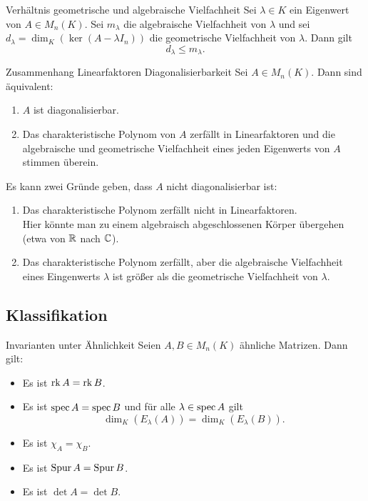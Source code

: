 \documentclass[main.tex]{subfiles}
\begin{document}
\begin{karte}{Verhältnis geometrische und algebraische Vielfachheit}
    Sei \( \lambda \in K \) ein Eigenwert von \( A \in M_n(K) \). 
    Sei \( m_\lambda \) die algebraische Vielfachheit von 
    \( \lambda \) und sei \( d_\lambda 
    = \dim_K(\ker(A - \lambda I_n)) \) die geometrische 
    Vielfachheit von \( \lambda \). Dann gilt
    \[ d_\lambda \leq m_\lambda. \]
\end{karte}
\begin{karte}{Zusammenhang Linearfaktoren Diagonalisierbarkeit}
    Sei \( A \in M_n(K) \). Dann sind äquivalent:
    \begin{enumerate}
        \item \(A\) ist diagonalisierbar.
        \item Das charakteristische Polynom von \(A\) zerfällt 
        in Linearfaktoren und die algebraische und geometrische 
        Vielfachheit eines jeden Eigenwerts von \(A\) stimmen 
        überein.
    \end{enumerate}
    Es kann zwei Gründe geben, dass \(A\) nicht diagonalisierbar 
    ist:
    \begin{enumerate}
        \item Das charakteristische Polynom zerfällt nicht in 
        Linearfaktoren.\\
        Hier könnte man zu einem algebraisch 
        abgeschlossenen Körper übergehen (etwa von \( \mathbb{R} \) 
        nach \( \mathbb{C} \)).
        \item Das charakteristische Polynom zerfällt, aber die 
        algebraische Vielfachheit eines Eingenwerts \( \lambda \) 
        ist größer als die geometrische Vielfachheit von 
        \( \lambda \).
    \end{enumerate}
\end{karte}
\subsection*{Klassifikation}
\begin{karte}{Invarianten unter Ähnlichkeit}
    Seien \( A, B \in M_n(K) \) ähnliche Matrizen. Dann gilt: 
    \begin{itemize}
        \item Es ist \( \operatorname{rk} A = \operatorname{rk} B \).
        \item Es ist \( \operatorname{spec} A = \operatorname{spec} B \) und für alle 
        \( \lambda \in \operatorname{spec} A \) gilt 
        \[ \dim_K(E_\lambda(A)) = \dim_K(E_\lambda(B)). \]
        \item Es ist \( \chi_A = \chi_B \).
        \item Es ist \( \operatorname{Spur} A = \operatorname{Spur} B \).
        \item Es ist \( \det A = \det B \).
    \end{itemize}
\end{karte}
\end{document}
